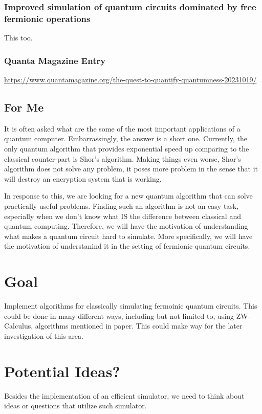 \documentclass[11pt]{article}
\begin{document}
\subsubsection{Improved simulation of quantum circuits dominated by free fermionic operations}
\label{sec:orgdfa7b4e}
This too.
\subsubsection{Quanta Magazine Entry}
\label{sec:org8641574}
\url{https://www.quantamagazine.org/the-quest-to-quantify-quantumness-20231019/}
\subsection{For Me}
\label{sec:orgfc1ec86}
It is often asked what are the some of the most important applications of a
quantum computer. Embarrassingly, the answer is a short one. Currently, the only
quantum algorithm that provides exponential speed up comparing to the classical
counter-part is Shor's algorithm. Making things even worse, Shor's algorithm
does not solve any problem, it poses more problem in the sense that it will
destroy an encryption system that is working.

In response to this, we are looking for a new quantum algorithm that can solve
practically useful problems. Finding such an algorithm is not an easy task,
especially when we don't know what IS the difference between classical and
quantum computing. Therefore, we will have the motivation of understanding what
makes a quantum circuit hard to simulate. More specifically, we will have the
motivation of understanind it in the setting of fermionic quantum circuits.
\section{Goal}
\label{sec:orge7c3add}
Implement algorithms for classically simulating fermoinic quantum circuits. This
could be done in many different ways, including but not limited to, using
ZW-Calculus, algorithms mentioned in paper. This could make way for the later
investigation of this area.
\section{Potential Ideas?}
\label{sec:org84e24c9}
Besides the implementation of an efficient simulator, we need to think about
ideas or questions that utilize such simulator.
\end{document}
